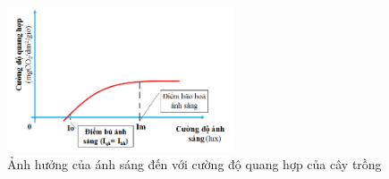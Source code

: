 \documentclass[12pt]{report}
\begin{document}
\begin{flushleft}
	\begin{figure}[H]
		\centering
		\includegraphics[width = 0.6\textwidth]{images/sodoanhsang.png}
		\caption{Ảnh hưởng của ánh sáng đến với cường độ quang hợp của cây trồng}
		\label{fig:image}
	\end{figure}
\end{flushleft}
\end{document}
